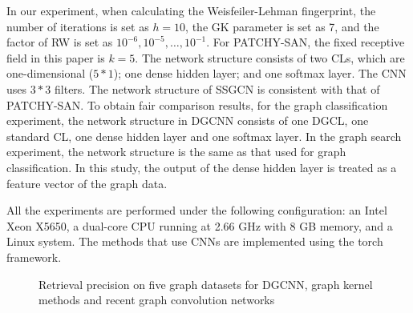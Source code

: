 \documentclass[11pt]{article}
\begin{document}
In our experiment, when calculating the Weisfeiler-Lehman fingerprint, the number of iterations is set as $h=10$, the GK parameter is set as 7, and the factor of RW is set as $10^{-6},10^{-5},…,10^{-1}$. For PATCHY-SAN, the fixed receptive field in this paper is $k=5$. The network structure consists of two CLs, which are one-dimensional ($5*1$); one dense hidden layer; and one softmax layer. The CNN uses $3*3$ filters. The network structure of SSGCN is consistent with that of PATCHY-SAN.
To obtain fair comparison results, for the graph classification experiment, the network structure in DGCNN consists of one DGCL, one standard CL, one dense hidden layer and one softmax layer. In the graph search experiment, the network structure is the same as that used for graph classification. In this study, the output of the dense hidden layer is treated as a feature vector of the graph data.

All the experiments are performed under the following configuration: an Intel Xeon X5650, a dual-core CPU running at 2.66 GHz  with 8 GB memory, and a Linux system. The methods that use CNNs are implemented using the torch framework.

\begin{figure}[t]
\hspace{0.6in}
\hspace{-1in}

\hspace{0.2in}

\caption{Retrieval precision on five graph datasets for DGCNN, graph kernel methods and recent graph convolution networks}\label{fig:retrieval}
\end{figure}
\end{document}
